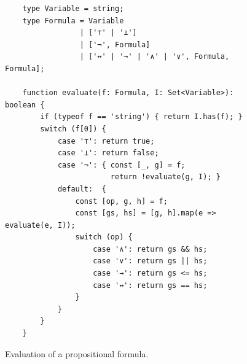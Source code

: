 \begin{figure}[!ht]
  \centering
\begin{verbatim}
    type Variable = string;
    type Formula = Variable 
                 | ['⊤' | '⊥'] 
                 | ['¬', Formula] 
                 | ['↔' | '→' | '∧' | '∨', Formula, Formula];
    
    function evaluate(f: Formula, I: Set<Variable>): boolean {
        if (typeof f == 'string') { return I.has(f); }
        switch (f[0]) {
            case '⊤': return true;
            case '⊥': return false;
            case '¬': { const [_, g] = f;
                        return !evaluate(g, I); }
            default:  { 
                const [op, g, h] = f;
                const [gs, hs] = [g, h].map(e => evaluate(e, I));
                switch (op) {
                    case '∧': return gs && hs;
                    case '∨': return gs || hs;
                    case '→': return gs <= hs;
                    case '↔': return gs == hs;
                }
            }
        }
    }
\end{verbatim}
\vspace*{-0.3cm}
  \caption{Evaluation of a propositional formula.}
  \label{fig:evaluate.py}
\end{figure} 

